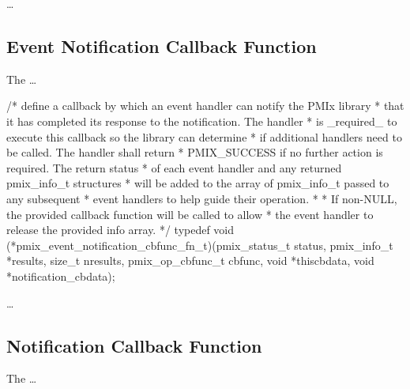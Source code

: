 \descr

\ldots


\subsection{Event Notification Callback Function}

The  \ldots

\cspecificstart
\begin{codepar}
/* define a callback by which an event handler can notify the PMIx library
 * that it has completed its response to the notification. The handler
 * is _required_ to execute this callback so the library can determine
 * if additional handlers need to be called. The handler shall return
 * PMIX_SUCCESS if no further action is required. The return status
 * of each event handler and any returned pmix_info_t structures
 * will be added to the array of pmix_info_t passed to any subsequent
 * event handlers to help guide their operation.
 *
 * If non-NULL, the provided callback function will be called to allow
 * the event handler to release the provided info array.
 */
typedef void (*pmix_event_notification_cbfunc_fn_t)(pmix_status_t status,
                                                    pmix_info_t *results, size_t nresults,
                                                    pmix_op_cbfunc_t cbfunc, void *thiscbdata,
                                                    void *notification_cbdata);
\end{codepar}
\cspecificend

\descr

\ldots


\subsection{Notification Callback Function}

The  \ldots

